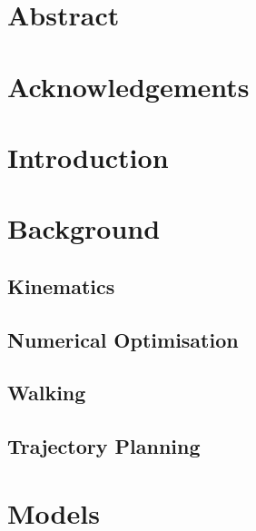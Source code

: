 \documentclass{UoNMCHA}
\begin{document}
	

	\vspace{-5mm}
	\section*{Abstract}
	\vspace{-3mm}
		

	\vspace{-2mm}
	\section*{Acknowledgements}
	\vspace{-3mm}
		

	\newpage\tableofcontents
	
	\newpage\listoffigures\listoftables\listofalgorithms
	
	
	\newpage\section{Introduction}
		

	\newpage\section{Background}\label{sec:Background}
		
		\subsection{Kinematics}
			
		\subsection{Numerical Optimisation}
			
		\subsection{Walking}
			
		\subsection{Trajectory Planning}
			
	
	\newpage\section{Models}\label{sec:Models}
		
\end{document}
